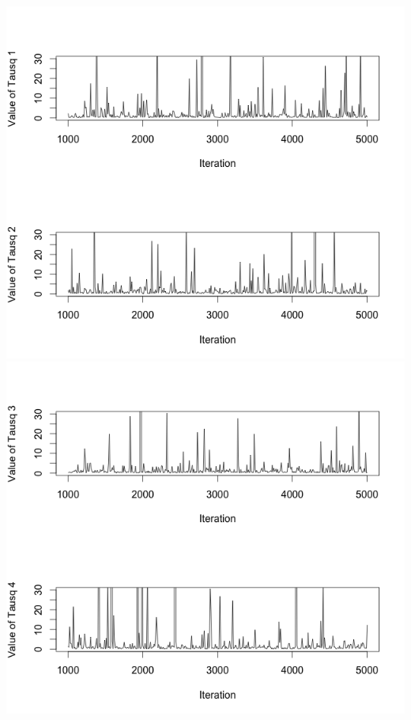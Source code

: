 \documentclass[12pt,letterpaper]{article}\usepackage[]{graphicx}\usepackage[]{color}
\begin{document}
\includegraphics[width=\textwidth]{new-tau1.png}
\includegraphics[width=\textwidth]{new-tau2.png}
\end{document}
